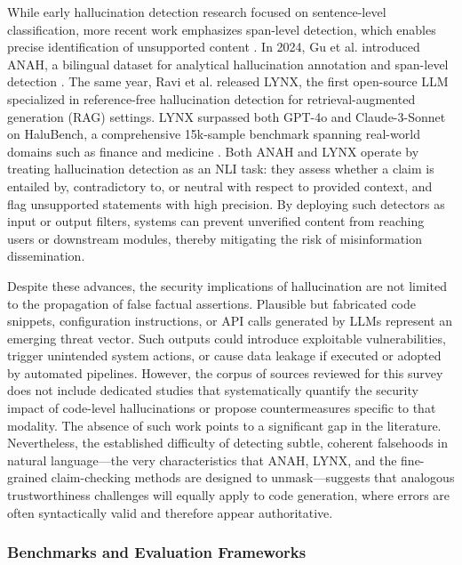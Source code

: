 \documentclass[11pt,a4paper]{article}
\begin{document}
While early hallucination detection research focused on sentence-level classification, more recent work emphasizes span-level detection, which enables precise identification of unsupported content \cite{Elchafei_2025_LLM_94763a97}. In 2024, Gu et al. introduced ANAH, a bilingual dataset for analytical hallucination annotation and span-level detection \cite{Gu_2024_Anah_c586886a}. The same year, Ravi et al. released LYNX, the first open-source LLM specialized in reference-free hallucination detection for retrieval-augmented generation (RAG) settings. LYNX surpassed both GPT-4o and Claude-3-Sonnet on HaluBench, a comprehensive 15k-sample benchmark spanning real-world domains such as finance and medicine \cite{Ravi_2024_Lynx_ce273f20}. Both ANAH and LYNX operate by treating hallucination detection as an NLI task: they assess whether a claim is entailed by, contradictory to, or neutral with respect to provided context, and flag unsupported statements with high precision. By deploying such detectors as input or output filters, systems can prevent unverified content from reaching users or downstream modules, thereby mitigating the risk of misinformation dissemination.

Despite these advances, the security implications of hallucination are not limited to the propagation of false factual assertions. Plausible but fabricated code snippets, configuration instructions, or API calls generated by LLMs represent an emerging threat vector. Such outputs could introduce exploitable vulnerabilities, trigger unintended system actions, or cause data leakage if executed or adopted by automated pipelines. However, the corpus of sources reviewed for this survey does not include dedicated studies that systematically quantify the security impact of code-level hallucinations or propose countermeasures specific to that modality. The absence of such work points to a significant gap in the literature. Nevertheless, the established difficulty of detecting subtle, coherent falsehoods in natural language---the very characteristics that ANAH, LYNX, and the fine-grained claim-checking methods are designed to unmask---suggests that analogous trustworthiness challenges will equally apply to code generation, where errors are often syntactically valid and therefore appear authoritative.

\subsubsection{Benchmarks and Evaluation Frameworks}
\end{document}
